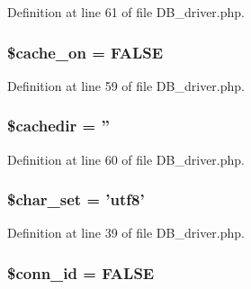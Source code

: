 Definition at line 61 of file D\-B\-\_\-driver.\-php.

\hypertarget{class_c_i___d_b__driver_ab29a8930111a4f2a57987a9031982c34}{
\subsubsection[{\$cache\-\_\-on}]{\setlength{\rightskip}{0pt plus 5cm}\${\bf cache\-\_\-on} = F\-A\-L\-S\-E}}\label{class_c_i___d_b__driver_ab29a8930111a4f2a57987a9031982c34}


Definition at line 59 of file D\-B\-\_\-driver.\-php.

\hypertarget{class_c_i___d_b__driver_a01f61437be9e9a04ee228f5d455265db}{
\subsubsection[{\$cachedir}]{\setlength{\rightskip}{0pt plus 5cm}\$cachedir = ''}}\label{class_c_i___d_b__driver_a01f61437be9e9a04ee228f5d455265db}


Definition at line 60 of file D\-B\-\_\-driver.\-php.

\hypertarget{class_c_i___d_b__driver_a0ea660eb249174aefdc2c35238fb1dc8}{
\subsubsection[{\$char\-\_\-set}]{\setlength{\rightskip}{0pt plus 5cm}\$char\-\_\-set = 'utf8'}}\label{class_c_i___d_b__driver_a0ea660eb249174aefdc2c35238fb1dc8}


Definition at line 39 of file D\-B\-\_\-driver.\-php.

\hypertarget{class_c_i___d_b__driver_a16c23f1dcbfed2f2759f5e54f604106d}{
\subsubsection[{\$conn\-\_\-id}]{\setlength{\rightskip}{0pt plus 5cm}\$conn\-\_\-id = F\-A\-L\-S\-E}}\label{class_c_i___d_b__driver_a16c23f1dcbfed2f2759f5e54f604106d}


